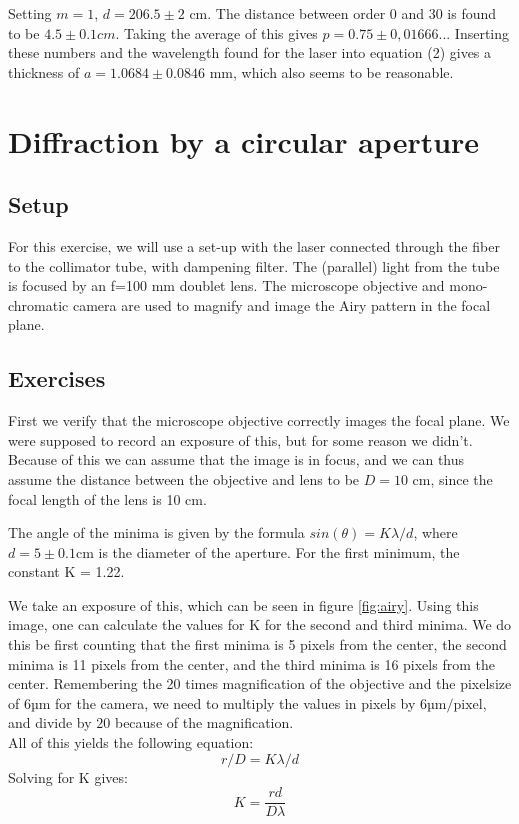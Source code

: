 \documentclass[a4paper,12pt]{article}
\begin{document}
Setting $m=1$, $d=206.5 \pm 2$ cm. The distance between order 0 and 30 is found to be $4.5 \pm 0.1 cm$. Taking the average of this gives $p = 0.75 \pm 0,01666..$. Inserting these numbers and the wavelength found for the laser into equation (2) gives a thickness of $a = 1.0684 \pm 0.0846$ mm, which also seems to be reasonable.

\section{Diffraction by a circular aperture}
\subsection{Setup}
For this exercise, we will use a set-up with the laser connected through the fiber to the collimator tube, with dampening filter. The (parallel) light from the tube is focused by an f=100 mm doublet lens. The microscope objective and mono-chromatic camera are used to magnify and image the Airy pattern in the focal plane.

\subsection{Exercises}
First we verify that the microscope objective correctly images the focal plane. We were supposed to record an exposure of this, but for some reason we didn't. Because of this we can assume that the image is in focus, and we can thus assume the distance between the objective and lens to be $D = 10$ cm, since the focal length of the lens is 10 cm.

The angle of the minima is given by the formula $sin(\theta) = K\lambda/d$, where $d=5 \pm 0.1$cm is the diameter of the aperture. For the first minimum, the constant K = 1.22. 

We take an exposure of this, which can be seen in figure \ref{fig:airy}. 
Using this image, one can calculate the values for K for the second and third minima. 
We do this be first counting that the first minima is 5 pixels from the center, the second minima is 11 pixels from the center, and the third minima is 16 pixels from the center.
Remembering the 20 times magnification of the objective and the pixelsize of 6µm for the camera, we need to multiply the values in pixels by $6 \text{µm/pixel}$, and divide by $20$ because of the magnification.\\

All of this yields the following equation:
\begin{equation}
r/D = K\lambda/d
\end{equation}
Solving for K gives:
\begin{equation}
K=\frac{rd}{D\lambda}
\end{equation}
\end{document}
